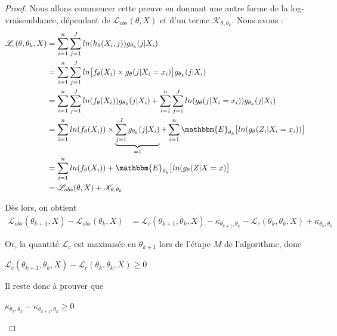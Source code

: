 \documentclass[frenchb]{report}
\newcommand{\1}{\mathbbm{1}}
\newcommand{\E}{\mathbbm{E}}
\newcommand{\K}{\mathcal{K}}
\newcommand{\lv}{\mathcal{L}}
\theoremstyle{definition}\newtheorem{defn}{Définition}
\theoremstyle{definition}\newtheorem{exm}{Exemple}
\theoremstyle{definition}\newtheorem{nota}{Notation}
\theoremstyle{definition}\newtheorem{rem}{Remarque}
\begin{document}
\begin{proof}

Nous allons commencer cette preuve en donnant une autre forme de la log-vraisemblance, dépendant de $\lv_ {obs}(\theta, X)$ et d'un terme $\K_{\theta,\theta_k}$. Nous avons :
\begin{align*}
\lv_c(\theta, \theta_k, X) &=  \displaystyle\sum_{i=1}^n\sum_{j=1}^J ln(h_\theta(X_i ,j))  g_{\theta_k}(j|X_i)\\
&=  \displaystyle\sum_{i=1}^n\sum_{j=1}^J ln\big[f_\theta(X_i)\times g_\theta(j|X_i=x_i)\big]g_{\theta_k}(j|X_i)\\
&=  \displaystyle\sum_{i=1}^n\sum_{j=1}^J ln(f_\theta(X_i))g_{\theta_k}(j|X_i) + \sum_{i=1}^n\sum_{j=1}^J ln(g_\theta(j|X_i=x_i))g_{\theta_k}(j|X_i)\\
&= \displaystyle\sum_{i=1}^n ln(f_\theta(X_i))\times\underbrace{\sum_{j=1}^J g_{\theta_k}(j|X_i)}_{=1} +\sum_{i=1}^n \E_{\theta_k}\big[ln(g_\theta(Z_i|X_i=x_i)) \big]\\
&= \displaystyle\sum_{i=1}^n ln(f_\theta(X_i)) + \E_{\theta_k}\big[ln(g_\theta(Z|X=x)\big] \\
&= \lv_{obs}(\theta, X) + \K_{\theta,\theta_k}
\end{align*}

Dès lors, on obtient
\begin{align*}
\lv_{obs}(\theta_{k+1}, X) - \lv_{obs}(\theta_k, X) &= \lv_c(\theta_{k+1}, \theta_k, X) - \kappa_{\theta_{k+1}, \theta_k} -  \lv_c(\theta_k, \theta_k, X) + \kappa_{\theta_{k}, \theta_k}
\end{align*}

Or, la quantité $\lv_c$ est maximisée en $\theta_{k+1}$ lors de l'étape $M$ de l'algorithme, donc
\begin{center} $ \lv_c(\theta_{k+1}, \theta_k, X) - \lv_c(\theta_k, \theta_k, X) \geq 0$ \end{center}

Il reste donc à prouver que 
\begin{center} $\kappa_{\theta_{k}, \theta_k}-\kappa_{\theta_{k+1}, \theta_k} \geq 0$ \end{center}


\end{proof}
\end{document}
